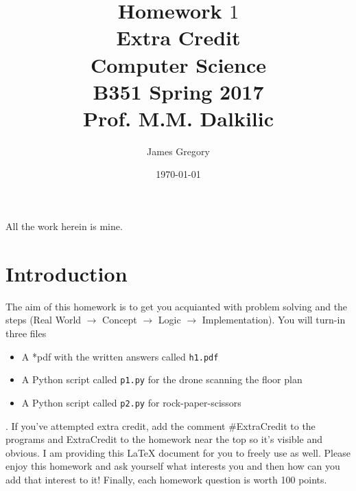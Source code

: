 \documentclass{article}
\begin{document}
\title{Homework $1$ \\ Extra Credit \\ Computer Science \\ B351 Spring 2017\\ Prof. M.M. Dalkilic}         %
\author{James Gregory}        %
\date{\today}          %
\maketitle


\makeatother     %




\pagestyle{plain}
All the work herein is mine.
\section*{Introduction}
The aim of this homework is to get you acquianted with problem solving and the steps  (Real World $\rightarrow$ Concept $\rightarrow$ Logic  $\rightarrow$ Implementation).  You will turn-in three files\begin{itemize} \item A *pdf with the written answers called \texttt{h1.pdf} \item A Python script called \texttt{p1.py} for the drone scanning the floor plan \item  A Python script called  \texttt{p2.py} for rock-paper-scissors \end{itemize}.  If you've attempted extra credit, add the comment \#ExtraCredit to the programs and ExtraCredit to the homework near the top so it's visible and obvious.  I am providing this \LaTeX{} document for you to freely use as well. Please enjoy this homework and ask yourself what interests you and then how can you add that interest to it!  Finally, each homework question is worth 100 points.
\newpage
\end{document}
